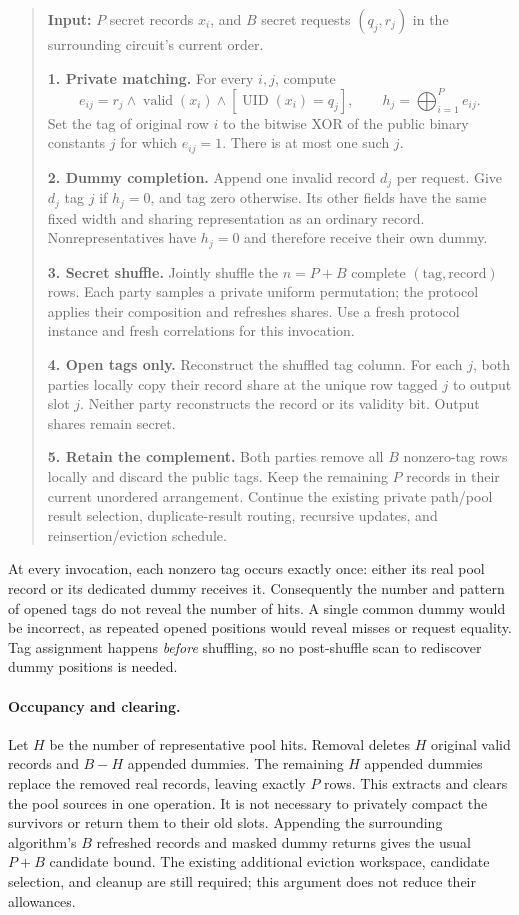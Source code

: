 \documentclass[11pt]{article}
\begin{document}
\begin{quote}\small
\textbf{Input:} $P$ secret records $x_i$, and $B$ secret requests
$(q_j,r_j)$ in the surrounding circuit's current order.

\textbf{1. Private matching.} For every $i,j$, compute
\[
 e_{ij}=r_j\wedge\operatorname{valid}(x_i)
              \wedge[\operatorname{UID}(x_i)=q_j],\qquad
 h_j=\bigoplus_{i=1}^{P}e_{ij}.
\]
Set the tag of original row $i$ to the bitwise XOR of the public binary
constants $j$ for which $e_{ij}=1$.  There is at most one such $j$.

\textbf{2. Dummy completion.} Append one invalid record $d_j$ per request.
Give $d_j$ tag $j$ if $h_j=0$, and tag zero otherwise.  Its other fields
have the same fixed width and sharing representation as an ordinary record.
Nonrepresentatives have $h_j=0$ and therefore receive their own dummy.

\textbf{3. Secret shuffle.} Jointly shuffle the $n=P+B$ complete
$(\mathrm{tag},\mathrm{record})$ rows.  Each party samples a private uniform
permutation; the protocol applies their composition and refreshes shares.
Use a fresh protocol instance and fresh correlations for this invocation.

\textbf{4. Open tags only.} Reconstruct the shuffled tag column.  For each
$j$, both parties locally copy their record share at the unique row tagged
$j$ to output slot $j$.  Neither party reconstructs the record or its
validity bit.  Output shares remain secret.

\textbf{5. Retain the complement.} Both parties remove all $B$ nonzero-tag
rows locally and discard the public tags.  Keep the remaining $P$ records
in their current unordered arrangement.  Continue the existing private
path/pool result selection, duplicate-result routing, recursive updates,
and reinsertion/eviction schedule.
\end{quote}

At every invocation, each nonzero tag occurs exactly once: either its real
pool record or its dedicated dummy receives it.  Consequently the number
and pattern of opened tags do not reveal the number of hits.  A single
common dummy would be incorrect, as repeated opened positions would reveal
misses or request equality.  Tag assignment happens \emph{before} shuffling,
so no post-shuffle scan to rediscover dummy positions is needed.

\paragraph{Occupancy and clearing.}
Let $H$ be the number of representative pool hits.  Removal deletes $H$
original valid records and $B-H$ appended dummies.  The remaining $H$
appended dummies replace the removed real records, leaving exactly $P$
rows.  This extracts and clears the pool sources in one operation.  It is
not necessary to privately compact the survivors or return them to their
old slots.  Appending the surrounding algorithm's $B$ refreshed records
and masked dummy returns gives the usual $P+B$ candidate bound.  The
existing additional eviction workspace, candidate selection, and cleanup
are still required; this argument does not reduce their allowances.
\end{document}
